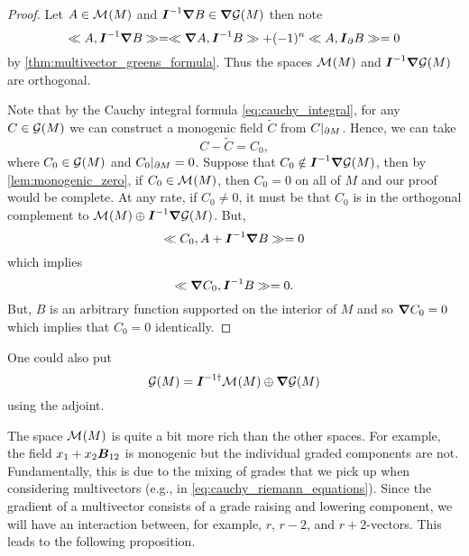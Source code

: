 \begin{proof}
Let $A \in \mathcal{M}^{}(M)$ and $\boldsymbol{I}^{-1}\boldsymbol{\nabla} B\in \boldsymbol{\nabla} \mathcal{G}(M)$ then note
\begin{equation}
\ll A, \boldsymbol{I}^{-1} \boldsymbol{\nabla} B\gg = \ll \boldsymbol{\nabla} A, \boldsymbol{I}^{-1} B\gg + (-1)^{n} \ll A, \boldsymbol{I}_\partial B\gg = 0
\end{equation}
by \cref{thm:multivector_greens_formula}. Thus the spaces $\mathcal{M}^{}(M)$ and $\boldsymbol{I}^{-1}\boldsymbol{\nabla} \mathcal{G}(M)$ are orthogonal. 

Note that by the Cauchy integral formula \cref{eq:cauchy_integral}, for any $C \in \mathcal{G}(M)$ we can construct a monogenic field $\tilde{C}$ from $C\vert_{\partial M}$. Hence, we can take
\begin{equation}
C - \tilde{C} = C_0,
\end{equation}
where $C_0\in \mathcal{G}(M)$ and $C_0\vert_{\partial M} =0$. Suppose that $C_0 \notin \boldsymbol{I}^{-1} \boldsymbol{\nabla} \mathcal{G}(M)$, then by \cref{lem:monogenic_zero}, if $C_0 \in \mathcal{M}^{}(M)$, then $C_0=0$ on all of $M$ and our proof would be complete. At any rate, if $C_0\neq 0$, it must be that $C_0$ is in the orthogonal complement to $\mathcal{M}^{}(M)\oplus \boldsymbol{I}^{-1}\boldsymbol{\nabla} \mathcal{G}(M)$. But,
\begin{equation}
\ll C_0, A+\boldsymbol{I}^{-1}\boldsymbol{\nabla} B\gg = 0
\end{equation}
which implies
\begin{equation}
\ll \boldsymbol{\nabla} C_0, \boldsymbol{I}^{-1} B\gg = 0.
\end{equation}
But, $B$ is an arbitrary function supported on the interior of $M$ and so $\boldsymbol{\nabla} C_0 =0$ which implies that $C_0=0$ identically. 
\end{proof}
\begin{remark}
One could also put
\begin{equation}
\mathcal{G}(M) = \boldsymbol{I}^{-1 \dagger} \mathcal{M}^{}(M) \oplus \boldsymbol{\nabla} \mathcal{G}(M)
\end{equation}
using the adjoint.
\end{remark}

The space $\mathcal{M}^{}(M)$ is quite a bit more rich than the other spaces.  For example, the field $x_1+x_2 \boldsymbol{B}_{12}$ is monogenic but the individual graded components are not. Fundamentally, this is due to the mixing of grades that we pick up when considering multivectors (e.g., in \cref{eq:cauchy_riemann_equations}). Since the gradient of a multivector consists of a grade raising and lowering component, we will have an interaction between, for example, $r$, $r-2$, and $r+2$-vectors. This leads to the following proposition.

